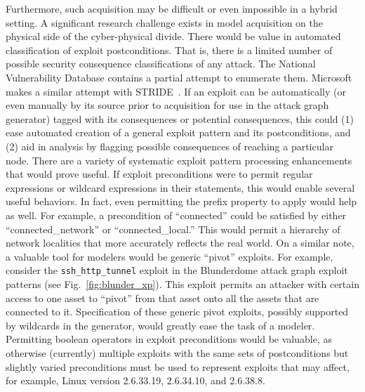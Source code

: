 Furthermore, such acquisition may be difficult or even impossible in a
hybrid setting. A significant research challenge exists in model acquisition on
the physical side of the cyber-physical divide.
There would be value in automated classification of exploit postconditions.
That is, there is a limited number of possible security consequence
classifications of any attack. The National Vulnerability Database contains a
partial attempt to enumerate them. Microsoft makes a similar attempt with
STRIDE~\cite{shostack2008experiences}. If an exploit can be automatically (or even manually by its source
prior to acquisition for use in the attack graph generator) tagged with its
consequences or potential consequences, this could (1) ease automated creation of
a general exploit pattern and its postconditions, and (2) aid in analysis by
flagging possible consequences of reaching a particular node. 
There are a variety of systematic exploit pattern processing enhancements that
would prove useful.
If exploit preconditions were to permit regular expressions or wildcard
expressions in their statements, this would enable several useful behaviors.
In fact, even permitting the prefix property to apply would help as well. For
example, a precondition of ``connected'' could be satisfied by either
``connected\_network'' or ``connected\_local.'' This would permit a hierarchy
of network localities that more accurately reflects the real world.
On a similar note, a valuable tool for modelers would be generic ``pivot''
exploits. For example, consider the \texttt{ssh\_http\_tunnel} exploit in the
Blunderdome attack graph exploit patterns (see Fig.~\ref{fig:blunder_xp}).
This exploit permits an attacker with certain access to one asset to ``pivot''
from that asset onto all the assets that are connected to it. Specification of
these generic pivot exploits, possibly supported by wildcards in the generator,
would greatly ease the task of a modeler.
Permitting boolean operators in exploit preconditions would be valuable, as
otherwise (currently) multiple exploits with the same sets of postconditions but
slightly varied preconditions must be used to represent exploits that may
affect, for example, Linux version 2.6.33.19, 2.6.34.10, and 2.6.38.8.
